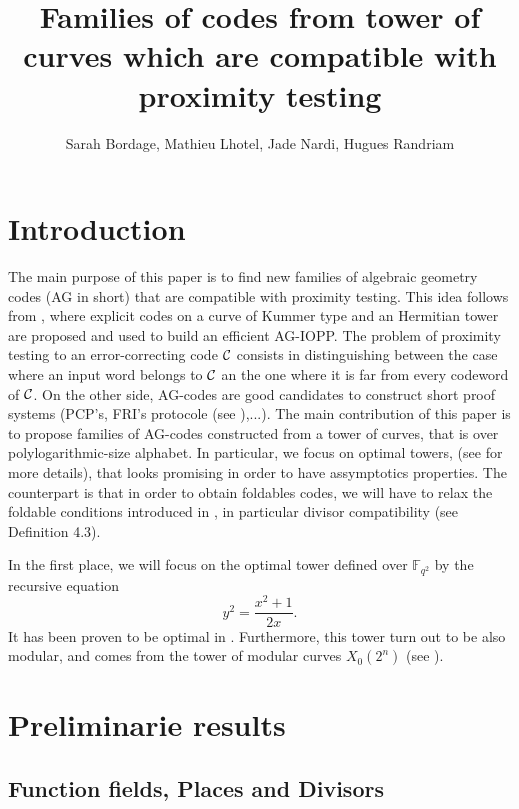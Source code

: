 \documentclass[10pt]{article}
\title{Families of codes from tower of curves which are compatible with proximity testing}
\author{Sarah Bordage, Mathieu Lhotel, Jade Nardi, Hugues Randriam}
\begin{document}
\maketitle


\tableofcontents
\newpage

\section{Introduction}

\s

The main purpose of this paper is to find new families of algebraic geometry codes (AG in short) that are compatible with proximity testing. This idea follows from \cite{IOPP}, where explicit codes on a curve of Kummer type and an Hermitian tower are proposed and used to build an efficient AG-IOPP. The problem of proximity testing to an error-correcting code $\mathcal{C}$ consists in distinguishing between the case where an input word belongs to $\mathcal{C}$ an the one where it is far from every codeword of $\mathcal{C}$. On the other side, AG-codes are good candidates to construct short proof systems (PCP's, FRI's protocole (see \cite{FRI}),...). The main contribution of this paper is to propose families of AG-codes constructed from a tower of curves, that is over polylogarithmic-size alphabet. In particular, we focus on optimal towers, (see \cite{GS} for more details), that looks promising in order to have assymptotics properties. The counterpart is that in order to obtain foldables codes, we will have to relax the foldable conditions introduced in \cite{IOPP}, in particular divisor compatibility (see Definition 4.3).

\s

In the first place, we will focus on the optimal tower defined over $\mathbb{F}_{q^2}$ by the recursive equation 
\begin{equation} 
y^2 = \dfrac{x^2+1}{2x}.
\end{equation} It has been proven to be optimal in \cite{GS}. Furthermore, this tower turn out to be also modular, and comes from the tower of modular curves $X_0(2^n)$ (see \cite{ELKS}). 

\s

\section{Preliminarie results}

\s

\subsection{Function fields, Places and Divisors}
\end{document}
